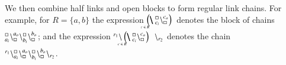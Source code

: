 We then combine half links and  open blocks to form regular link chains.
%
 For example, for $R = \{a,b\}$ the expression $ \blockchain{c_i}{c_o}{c \in R} $\;
denotes the block of chains ${}_{a_i}^{\scriptstyle {\square}}\backslash_{\scriptstyle {\square}}^{a_o} \backslash{}_{b_i}^{\scriptstyle {\square}}\backslash_{\scriptstyle {\square}}^{b_o}$; and the expression $\link{r_1}{} \blockchain{c_i}{c_o}{c \in R}\;\link{}{r_2} $ denotes the chain \\
$ {}^{r_1}\backslash_{a_i}^{\scriptstyle {\square}}\backslash_{\scriptstyle {\square}}^{a_o}\backslash_{b_i}^{\scriptstyle {\square}}\backslash_{\scriptstyle {\square}}^{b_o}\backslash_{r_2}$.
